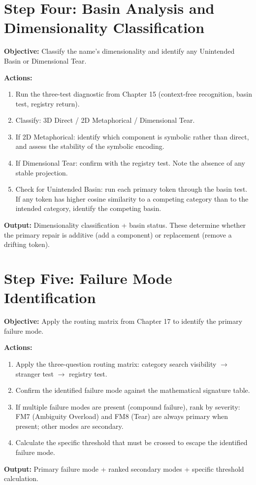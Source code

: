 \documentclass[12pt, openany]{book}
\theoremstyle{thmstyle}
\theoremstyle{defstyle}
\begin{document}
\section{Step Four: Basin Analysis and Dimensionality Classification}

\begin{auditbox}
\textbf{Objective:} Classify the name's dimensionality and identify any Unintended Basin or Dimensional Tear.

\textbf{Actions:}
\begin{enumerate}[leftmargin=1.5em, topsep=2pt]
  \item Run the three-test diagnostic from Chapter 15 (context-free recognition, basin test, registry return).
  \item Classify: 3D Direct / 2D Metaphorical / Dimensional Tear.
  \item If 2D Metaphorical: identify which component is symbolic rather than direct, and assess the stability of the symbolic encoding.
  \item If Dimensional Tear: confirm with the registry test. Note the absence of any stable projection.
  \item Check for Unintended Basin: run each primary token through the basin test. If any token has higher cosine similarity to a competing category than to the intended category, identify the competing basin.
\end{enumerate}

\textbf{Output:} Dimensionality classification + basin status. These determine whether the primary repair is additive (add a component) or replacement (remove a drifting token).
\end{auditbox}

\section{Step Five: Failure Mode Identification}

\begin{auditbox}
\textbf{Objective:} Apply the routing matrix from Chapter 17 to identify the primary failure mode.

\textbf{Actions:}
\begin{enumerate}[leftmargin=1.5em, topsep=2pt]
  \item Apply the three-question routing matrix: category search visibility $\to$ stranger test $\to$ registry test.
  \item Confirm the identified failure mode against the mathematical signature table.
  \item If multiple failure modes are present (compound failure), rank by severity: FM7 (Ambiguity Overload) and FM8 (Tear) are always primary when present; other modes are secondary.
  \item Calculate the specific threshold that must be crossed to escape the identified failure mode.
\end{enumerate}

\textbf{Output:} Primary failure mode + ranked secondary modes + specific threshold calculation.
\end{auditbox}
\end{document}
